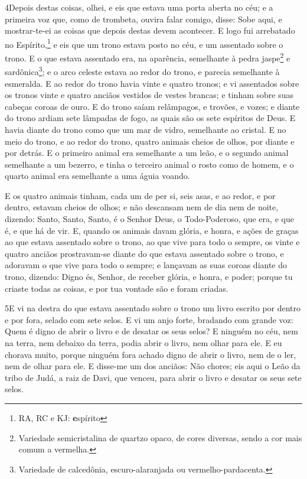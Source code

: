 \lettrine{4} Depois destas coisas, olhei, e eis que estava uma
porta aberta no céu; e a primeira voz que, como de trombeta, ouvira
falar comigo, disse: Sobe aqui, e mostrar-te-ei as coisas que depois
destas devem acontecer. E logo fui arrebatado no
Espírito,\footnote{RA, RC e KJ: \textbf{e}spírito} e eis que um
trono estava posto no céu, e um assentado sobre o trono. E o que
estava assentado era, na aparência, semelhante à pedra
jaspe\footnote{Variedade semicristalina de quartzo opaco, de cores
diversas, sendo a cor mais comum a vermelha.} e
sardônica\footnote{Variedade de calcedônia, escuro-alaranjada ou
vermelho-pardacenta.}; e o arco celeste estava ao redor do trono, e
parecia semelhante à esmeralda. E ao redor do trono havia vinte
e quatro tronos; e vi assentados sobre os tronos vinte e quatro
anciãos vestidos de vestes brancas; e tinham sobre suas cabeças
coroas de ouro. E do trono saíam relâmpagos, e trovões, e vozes;
e diante do trono ardiam sete lâmpadas de fogo, as quais são os sete
espíritos de Deus. E havia diante do trono como que um mar de
vidro, semelhante ao cristal. E no meio do trono, e ao redor do
trono, quatro animais cheios de olhos, por diante e por detrás.
E o primeiro animal era semelhante a um leão, e o segundo animal
semelhante a um bezerro, e tinha o terceiro animal o rosto como de
homem, e o quarto animal era semelhante a uma águia voando.

E os quatro animais tinham, cada um de per si, seis asas, e ao
redor, e por dentro, estavam cheios de olhos; e não descansam nem de
dia nem de noite, dizendo: Santo, Santo, Santo, é o Senhor Deus, o
Todo-Poderoso, que era, e que é, e que há de vir. E, quando os
animais davam glória, e honra, e ações de graças ao que estava
assentado sobre o trono, ao que vive para todo o sempre, os
vinte e quatro anciãos prostravam-se diante do que estava assentado
sobre o trono, e adoravam o que vive para todo o sempre; e lançavam
as suas coroas diante do trono, dizendo: Digno és, Senhor, de
receber glória, e honra, e poder; porque tu criaste todas as coisas,
e por tua vontade são e foram criadas.

\medskip

\lettrine{5} E vi na destra do que estava assentado sobre o
trono um livro escrito por dentro e por fora, selado com sete selos.
E vi um anjo forte, bradando com grande voz: Quem é digno de
abrir o livro e de desatar os seus selos? E ninguém no céu, nem
na terra, nem debaixo da terra, podia abrir o livro, nem olhar para
ele. E eu chorava muito, porque ninguém fora achado digno de
abrir o livro, nem de o ler, nem de olhar para ele. E disse-me
um dos anciãos: Não chores; eis aqui o Leão da tribo de Judá, a raiz
de Davi, que venceu, para abrir o livro e desatar os seus sete
selos.

